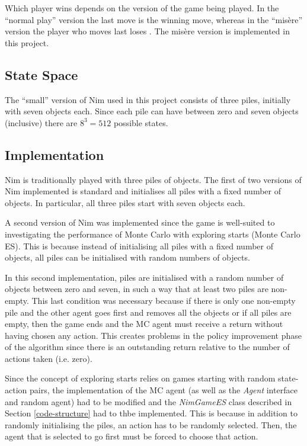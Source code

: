 \documentclass[11pt,a4paper]{report}
\begin{document}
Which player wins depends on the version of the game being played. In the ``normal play'' version the last move is the winning move, whereas in the ``mis\`ere'' version the player who moves last loses \cite{winning-ways-math-plays}. The mis\`ere version is implemented in this project.


\subsection{State Space}

The ``small'' version of Nim used in this project  consists of three piles, initially with seven objects each. Since each pile can have between zero and seven objects (inclusive) there are $8^3 = 512$ possible states.


\subsection{Implementation}
\label{sec:NimImplementation}

Nim is traditionally played with three piles of objects. The first of two versions of Nim implemented is standard and initialises all piles with a fixed number of objects. In particular, all three piles start with seven objects each.

A second version of Nim was implemented since the game is well-suited to investigating the performance of Monte Carlo with exploring starts (Monte Carlo ES). This is because instead of initialising all piles with a fixed number of objects, all piles can be initialised with random numbers of objects.

In this second implementation, piles are initialised with a random number of objects between zero and seven, in such a way that at least two piles are non-empty. This last condition was necessary because if there is only one non-empty pile and the other agent goes first and removes all the objects or if all piles are empty, then the game ends and the MC agent must receive a return without having chosen any action. This creates problems in the policy improvement phase of the algorithm since there is an outstanding return relative to the number of actions taken (i.e. zero).

Since the concept of exploring starts relies on games starting with random state-action pairs, the implementation of the MC agent (as well as the \emph{Agent} interface and random agent) had to be modified and the \emph{NimGameES} class described in Section \ref{code-structure} had to thbe implemented. This is because in addition to randomly initialising the piles, an action has to be randomly selected. Then, the agent that is selected to go first must be forced to choose that action.
\end{document}
